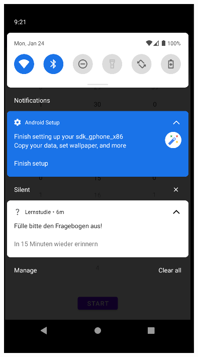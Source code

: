 \documentclass[ngerman]{tutorial}
\begin{document}
\begin{center}
    \includegraphics[scale=0.5]{learn_tosurvey.png}
\end{center}



\newpage
\end{document}

